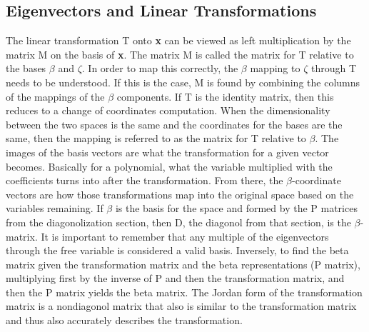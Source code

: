 \documentclass[12pt]{article}
\begin{document}
\subsection{Eigenvectors and Linear Transformations}
The linear transformation T onto \textbf{x} can be viewed as left multiplication by the matrix M on the basis of \textbf{x}. The matrix M is called the matrix for T relative to the bases 
$\beta$ and $\zeta$. In order to map this correctly, the $\beta$ mapping to $\zeta$ through T needs to be understood. If this is the case, M is found by combining the columns of 
the mappings of the $\beta$ components. If T is the identity matrix, then this reduces to a change of coordinates computation. When the dimensionality between the two spaces is the same 
and the coordinates for the bases are the same, then the mapping is referred to as the matrix for T relative to $\beta$. The images of the basis vectors are what the transformation for 
a given vector becomes. Basically for a polynomial, what the variable multiplied with the coefficients turns into after the transformation. From there, the $\beta$-coordinate vectors 
are how those transformations map into the original space based on the variables remaining. 
\newline
\newline
If $\beta$ is the basis for the space and formed by the P matrices from the diagonolization section, then D, the diagonol from that section, is the $\beta$-matrix. It is important to 
remember that any multiple of the eigenvectors through the free variable is considered a valid basis. Inversely, to find the beta matrix given the transformation matrix and the beta 
representations (P matrix), multiplying first by the inverse of P and then the transformation matrix, and then the P matrix yields the beta matrix. The Jordan form of the 
transformation matrix is a nondiagonol matrix that also is similar to the transformation matrix and thus also accurately describes the transformation. 
\end{document}
